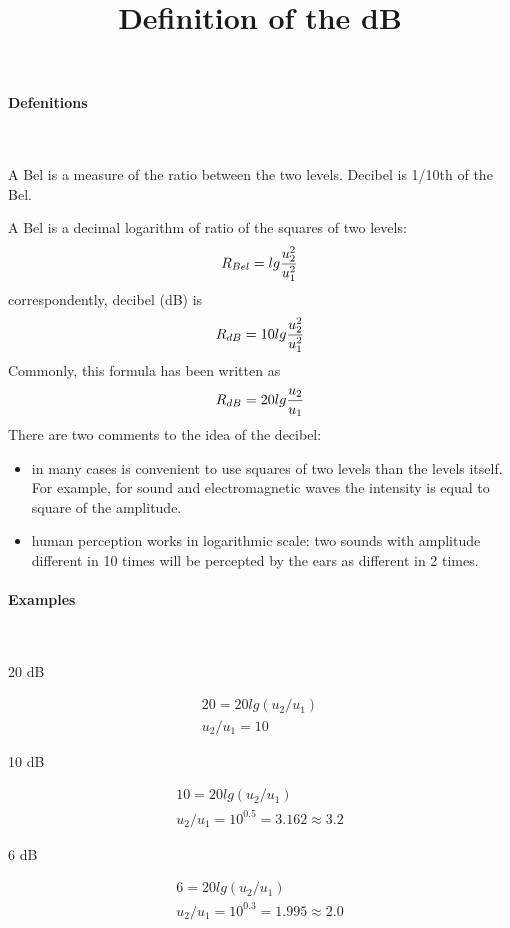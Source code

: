 \documentclass[12pt,english]{article}   %
\begin{document}
\title{Definition of the dB}

\maketitle

\paragraph{Defenitions}
\ 

A Bel is a measure of the ratio between the two levels. Decibel is 1/10th of the Bel.

A Bel is a decimal logarithm of ratio of the squares of two levels:
$$
R_{Bel} = lg\dfrac{u^2_2}{u^2_1} \\
$$
correspondently, decibel (dB) is
$$
R_{dB} = 10lg\dfrac{u^2_2}{u^2_1} \\
$$
Commonly, this formula has been written as
$$
R_{dB} = 20lg\dfrac{u_2}{u_1} \\
$$
There are two comments to the idea of the decibel:
\begin{itemize}
\item in many cases is convenient to use squares of two levels than the levels itself.
For example, for sound and electromagnetic waves the intensity is equal to square of the amplitude. 
\item human perception works in logarithmic scale: two sounds with amplitude different in 10 times will be percepted by the ears as different in 2 times. 
\end{itemize}

\paragraph{Examples}
\ 
 
20 dB

\begin{align*}
20 = 20lg(u_2/u_1) \\
u_2/u_1 = 10
\end{align*}

10 dB

\begin{align*}
10 = 20lg(u_2/u_1) \\
u_2/u_1 = 10^{0.5} = 3.162 \approx 3.2
\end{align*}

6 dB

\begin{align*}
6 = 20lg(u_2/u_1) \\
u_2/u_1 = 10^{0.3} = 1.995 \approx 2.0
\end{align*}
\end{document}
